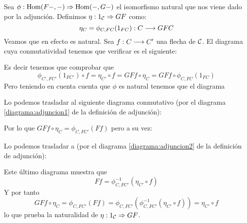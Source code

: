 Sea $\phi : \operatorname{Hom}(F-, -)\Rightarrow \operatorname{Hom}(-, G-)$ el isomorfismo natural que
nos viene dado por la adjunción. Definimos $\eta : 1_{\mathcal{C}}\Rightarrow GF$
como:
$$\eta_C = \phi_{C, FC}(1_{FC}) : C\longrightarrow GFC$$
Veamos que en efecto es natural. Sea $f : C\longrightarrow C'$
una flecha de $\mathcal{C}$. El diagrama cuya conmutatividad
tenemos que verificar es el siguiente:
\begin{center}
\end{center}
Es decir tenemos que comprobar que
$$\phi_{C', FC'}(1_{FC'}) \circ f = \eta_{C'} \circ f = GFf \circ \eta_C
  = GFf \circ \phi_{C, FC}(1_{FC})$$
Pero teniendo en cuenta cuenta que $\phi$ es natural tenemos que el diagrama
\begin{center}
\end{center}
Lo podemos trasladar al siguiente diagrama conmutativo (por el
diagrama \eqref{diagrama:adjuncion1} de la definición de adjunción):
\begin{center}
\end{center}
Por lo que $GFf \circ \eta_C = \phi_{C, FC'}(Ff)$ pero a su vez:
\begin{center}
\end{center}
Lo podemos trasladar a (por el diagrama \eqref{diagrama:adjuncion2}
de la definición de adjunción):
\begin{center}
\end{center}
Este último diagrama muestra que
$$Ff = \phi^{-1}_{C, FC'}(\eta_{C'} \circ f)$$
Y por tanto
$$GFf \circ \eta_C = \phi_{C, FC'}(Ff) = \phi_{C, FC'}
  (\phi^{-1}_{C,FC'}(\eta_{C'} \circ f)) = \eta_{C'} \circ f$$
lo que prueba la naturalidad de $\eta : 1_{\mathcal{C}}\Rightarrow GF$.

